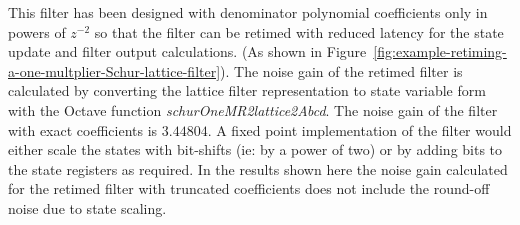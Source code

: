 \documentclass[a4paper,twoside,10pt,english]{report}
\begin{document}
This filter has been designed with denominator polynomial coefficients only
in powers of $z^{-2}$ so that the filter can be retimed with reduced latency for
the state update and filter output calculations. (As shown in 
Figure~\ref{fig:example-retiming-a-one-multplier-Schur-lattice-filter}). The 
noise gain of the retimed filter is calculated by converting the lattice 
filter representation to state variable form with the Octave function
\emph{schurOneMR2lattice2Abcd}. The noise gain of the filter with exact
coefficients is $3.44804$. A fixed point implementation of the filter would
either scale the states with bit-shifts (ie: by a power of two) or by adding
bits to the state registers as required. In the results shown here the noise
gain calculated for the retimed filter with truncated coefficients does not
include the round-off noise due to state scaling.
\end{document}
